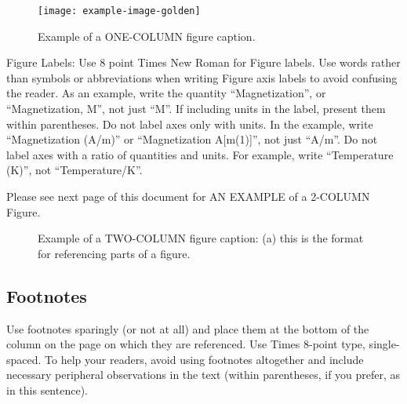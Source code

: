 \documentclass[conference,flushend]{iaria-lite}
\begin{document}
\begin{figure}[htbp]
    \centering
    \texttt{[image: example-image-golden]}
    \caption{Example of a ONE-COLUMN figure caption.}
\end{figure}


Figure Labels: Use 8 point Times New Roman for Figure labels. Use words rather than symbols or abbreviations when writing Figure axis labels to avoid confusing the reader. As an example, write the quantity “Magnetization”, or “Magnetization, M”, not just “M”. If including units in the label, present them within parentheses. Do not label axes only with units. In the example, write “Magnetization (A/m)” or “Magnetization {A[m(1)]}”, not just “A/m”. Do not label axes with a ratio of quantities and units. For example, write “Temperature (K)”, not “Temperature/K”.

Please see next page of this document for AN EXAMPLE of a 2-COLUMN Figure.

\begin{figure}[htb!]
    \centering
    \quad
    \caption{Example of a TWO-COLUMN figure caption: (a) this is the format for referencing parts of a figure.}
\end{figure}

\subsection{Footnotes}
Use footnotes sparingly (or not at all) and place them at the bottom of the column on the page on which they are referenced. Use Times 8-point type, single-spaced. To help your readers, avoid using footnotes altogether and include necessary peripheral observations in the text (within parentheses, if you prefer, as in this sentence).
\end{document}
